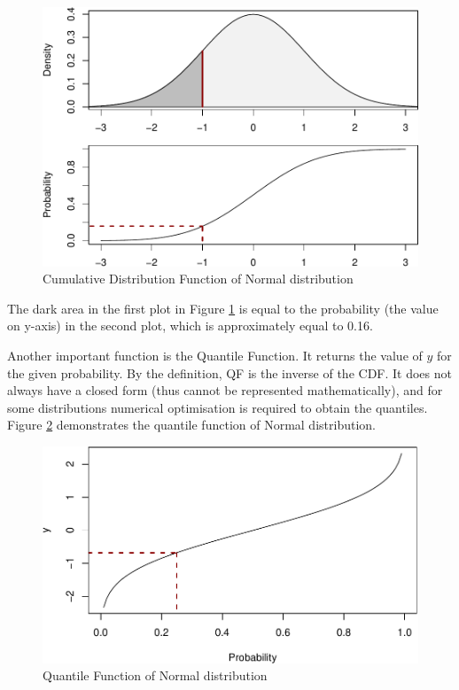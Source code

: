 \documentclass[
]{book}
\theoremstyle{definition}
\theoremstyle{definition}
\theoremstyle{definition}
\theoremstyle{definition}
\theoremstyle{remark}
\begin{document}
\begin{figure}
\centering
\includegraphics{Svetunkov---Statistics-for-Business-Analytics_files/figure-latex/dnormPlotIntroCDFPDF-1.pdf}
\caption{\label{fig:dnormPlotIntroCDFPDF}Cumulative Distribution Function of Normal distribution}
\end{figure}

The dark area in the first plot in Figure \ref{fig:dnormPlotIntroCDFPDF} is equal to the probability (the value on y-axis) in the second plot, which is approximately equal to 0.16.

Another important function is the Quantile Function. It returns the value of \(y\) for the given probability. By the definition, QF is the inverse of the CDF. It does not always have a closed form (thus cannot be represented mathematically), and for some distributions numerical optimisation is required to obtain the quantiles. Figure \ref{fig:dnormPlotIntroQF} demonstrates the quantile function of Normal distribution.

\begin{figure}
\centering
\includegraphics{Svetunkov---Statistics-for-Business-Analytics_files/figure-latex/dnormPlotIntroQF-1.pdf}
\caption{\label{fig:dnormPlotIntroQF}Quantile Function of Normal distribution}
\end{figure}
\end{document}
